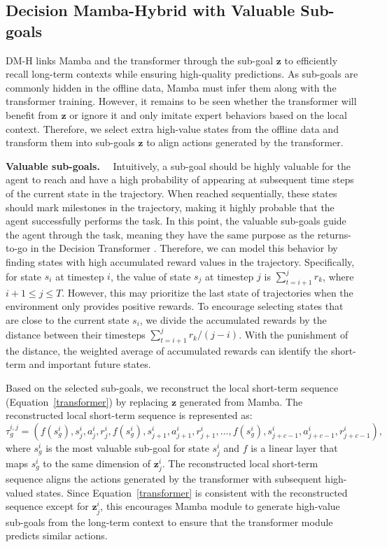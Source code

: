 \subsection{Decision Mamba-Hybrid with Valuable Sub-goals}

DM-H links Mamba and the transformer through the sub-goal $\textbf{z}$ to efficiently recall long-term contexts while ensuring high-quality predictions. As sub-goals are commonly hidden in the offline data, Mamba must infer them along with the transformer training. However, it remains to be seen whether the transformer will benefit from $\textbf{z}$ or ignore it and only imitate expert behaviors based on the local context. Therefore, we select extra high-value states from the offline data and transform them into sub-goals $\textbf{z}$ to align actions generated by the transformer.

\noindent\textbf{Valuable sub-goals.}~~
Intuitively, a sub-goal should be highly valuable for the agent to reach and have a high probability of appearing at subsequent time steps of the current state in the trajectory. When reached sequentially, these states should mark milestones in the trajectory, making it highly probable that the agent successfully performs the task. In this point, the valuable sub-goals guide the agent through the task, meaning they have the same purpose as the returns-to-go in the Decision Transformer \cite{2}. Therefore, we can model this behavior by finding states with high accumulated reward values in the trajectory. Specifically, for state $s_i$ at timestep $i$, the value of state $s_j$ at timestep $j$ is $\sum_{t=i+1}^jr_k$, where $i+1\leq j\leq T$. However, this may prioritize the last state of trajectories when the environment only provides positive rewards. To encourage selecting states that are close to the current state $s_i$, we divide the accumulated rewards by the distance between their timesteps $\sum_{t=i+1}^jr_k/(j-i)$. With the punishment of the distance, the weighted average of accumulated rewards can identify the short-term and important future states.

Based on the selected sub-goals, we reconstruct the local short-term sequence (Equation~\eqref{transformer}) by replacing $\textbf{z}$ generated from Mamba. The reconstructed local short-term sequence is represented as:
\begin{equation}
\tau_g^{i,j}=(f(s_g^i),s_j^i,a_j^i,r_j^i, f(s_g^i),s_{j+1}^i,a_{j+1}^i,r_{j+1}^i, \dots,f(s_g^i),s_{j+c-1}^i,a_{j+c-1}^i,r_{j+c-1}^i),
\label{g_transformer}
\end{equation}
where $s_g^i$ is the most valuable sub-goal for state $s_j^i$ and $f$ is a linear layer that maps $s_g^i$ to the same dimension of $\textbf{z}_{j}^i$. The reconstructed local short-term sequence aligns the actions generated by the transformer with subsequent high-valued states. Since Equation~\eqref{transformer} is consistent with the reconstructed sequence except for $\textbf{z}_{j}^i$, this encourages Mamba module to generate high-value sub-goals from the long-term context to ensure that the transformer module predicts similar actions.

